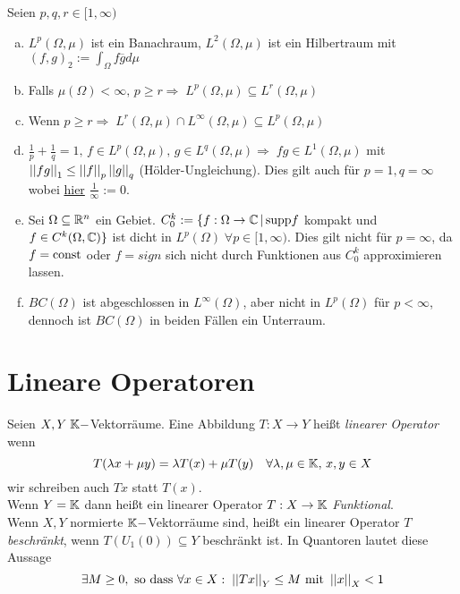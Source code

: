 \documentclass[ngerman]{report}
\begin{document}
	\begin{bem}
		Seien $p,q,r\in [1,\infty)$
		\begin{enumerate}[(a)]
			\item $L^p(\Omega,\mu)$ ist ein Banachraum, $L^2(\Omega,\mu)$ ist ein Hilbertraum mit $(f,g)_2 := \int_\Omega f \overline{g} d\mu$
			
			\item Falls $\mu(\Omega) < \infty,\, p\geq r \Rightarrow\; L^p(\Omega,\mu)\subseteq L^r(\Omega,\mu)$
			
			\item Wenn $p\geq r\Rightarrow\; L^r(\Omega,\mu)\cap L^\infty(\Omega,\mu)\subseteq L^p(\Omega,\mu)$
			
			\item $\frac{1}{p}+\frac{1}{q}=1,\,f\in L^p(\Omega,\mu),\,g\in L^q(\Omega,\mu)\Rightarrow\;fg\in 		 L^1(\Omega,\mu)$ mit $\left\lvert \left\lvert fg \right\rvert \right\rvert_1\leq\left\lvert \left\lvert f \right\rvert \right\rvert_p\left\lvert \left\lvert g \right\rvert \right\rvert_q$ (Hölder-Ungleichung). Dies gilt auch für $p=1, q=\infty$ wobei \underline{hier} $\frac{1}{\infty}:=0$.
			
			\item Sei $\Omega\subseteq \mathbb{R}^n$ ein Gebiet. $C^k_0:=\{f:\Omega \rightarrow \mathbb{C}\,|\, \textnormal{supp} f$ kompakt und $f\in C^k(\Omega,\mathbb{C})\}$ ist dicht in $L^p(\Omega)\;\forall p\in[1,\infty)$. Dies gilt nicht für $p=\infty$, da $f=\textnormal{const}$ oder $f=sign$ sich nicht durch Funktionen aus $C^k_0$ approximieren lassen.
			
			\item $BC(\Omega)$ ist abgeschlossen in $L^\infty (\Omega)$, aber nicht in $L^p(\Omega)$ für $p<\infty$, dennoch ist $BC(\Omega)$ in beiden Fällen ein Unterraum.
		\end{enumerate}
	\end{bem}



\section{Lineare Operatoren}

	\begin{definition}
		Seien $X,Y\; \mathbb{K}-$Vektorräume. Eine Abbildung $T:X\rightarrow Y$ heißt \textit{linearer Operator} wenn 
		$$T(\lambda x+\mu y) = \lambda T(x) + \mu T(y)\quad \forall \lambda,\mu \in \mathbb{K},\,x,y\in X$$ 
		wir schreiben auch $Tx$ statt $T(x)$.\\
		Wenn $Y=\mathbb{K}$ dann heißt ein linearer Operator $T:X\rightarrow \mathbb{K}$\textit{ Funktional}.\\
		Wenn $X,Y$ normierte $\mathbb{K}-$Vektorräume sind, heißt ein linearer Operator $T$ \textit{beschränkt}, wenn $T(U_1(0)) \subseteq Y$ beschränkt ist. In Quantoren lautet diese Aussage
			$$ \exists M \geq 0, \text{ so dass } \forall x\in X :\; \left\lvert \left\lvert Tx \right\rvert \right\rvert_Y \leq M \text{ mit } \left\lvert \left\lvert x \right\rvert \right\rvert_X < 1$$
	\end{definition}
\end{document}
